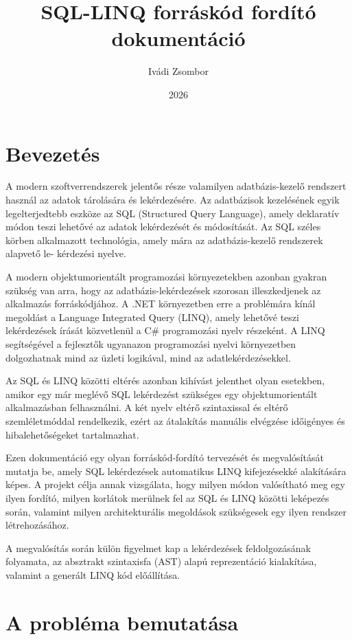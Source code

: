 \documentclass[a4paper,12pt]{article}
\title{SQL-LINQ forráskód fordító dokumentáció}
\author{Ivádi Zsombor}
\date{2026}
\begin{document}
\maketitle

\tableofcontents

\newpage

\section{Bevezetés}
A modern szoftverrendszerek jelentős része valamilyen adatbázis-kezelő rendszert használ az adatok tárolására és lekérdezésére. Az adatbázisok kezelésének egyik legelterjedtebb eszköze az SQL (Structured Query Language), amely deklaratív módon teszi lehetővé az adatok lekérdezését és módosítását. Az SQL széles körben alkalmazott technológia, amely mára az adatbázis-kezelő rendszerek alapvető le-
kérdezési nyelve.

A modern objektumorientált programozási környezetekben azonban gyakran szükség van arra, hogy az adatbázis-lekérdezések szorosan illeszkedjenek az alkalmazás forráskódjához. A .NET környezetben erre a problémára kínál megoldást a Language Integrated Query (LINQ), amely lehetővé teszi lekérdezések írását közvetlenül a C\# programozási nyelv részeként. A LINQ segítségével a fejlesztők ugyanazon programozási nyelvi környezetben dolgozhatnak mind az üzleti logikával, mind az adatlekérdezésekkel.

Az SQL és LINQ közötti eltérés azonban kihívást jelenthet olyan esetekben, amikor egy már meglévő SQL lekérdezést szükséges egy objektumorientált alkalmazásban felhasználni. A két nyelv eltérő szintaxissal és eltérő szemléletmóddal rendelkezik, ezért az átalakítás manuális elvégzése időigényes és hibalehetőségeket tartalmazhat.

Ezen dokumentáció egy olyan forráskód-fordító tervezését és megvalósítását mutatja be, amely SQL lekérdezések automatikus LINQ kifejezésekké alakítására képes. A projekt célja annak vizsgálata, hogy milyen módon valósítható meg egy ilyen fordító, milyen korlátok merülnek fel az SQL és LINQ közötti leképezés során, valamint milyen architekturális megoldások szükségesek egy ilyen rendszer létrehozásához.

A megvalósítás során külön figyelmet kap a lekérdezések feldolgozásának folyamata, az absztrakt szintaxisfa (AST) alapú reprezentáció kialakítása, valamint a generált LINQ kód előállítása.

\section{A probléma bemutatása}
\end{document}
